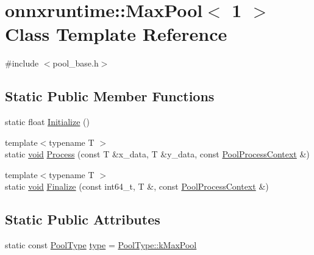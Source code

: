 \hypertarget{classonnxruntime_1_1MaxPool_3_011_01_4}{}\section{onnxruntime\+:\+:Max\+Pool$<$ 1 $>$ Class Template Reference}
\label{classonnxruntime_1_1MaxPool_3_011_01_4}


{\ttfamily \#include $<$pool\+\_\+base.\+h$>$}

\subsection*{Static Public Member Functions}
\begin{DoxyCompactItemize}
\item 
static float \mbox{\hyperlink{classonnxruntime_1_1MaxPool_3_011_01_4_a367e8d3ad38fd5a76cf422ef6915b104}{Initialize}} ()
\item 
{\footnotesize template$<$typename T $>$ }\\static \mbox{\hyperlink{mlasi_8h_a88f941d423cb2a819b70a1358982b1a6}{void}} \mbox{\hyperlink{classonnxruntime_1_1MaxPool_3_011_01_4_a02cd39e53eae93f41f8d10332e214b05}{Process}} (const T \&x\+\_\+data, T \&y\+\_\+data, const \mbox{\hyperlink{classonnxruntime_1_1PoolProcessContext}{Pool\+Process\+Context}} \&)
\item 
{\footnotesize template$<$typename T $>$ }\\static \mbox{\hyperlink{mlasi_8h_a88f941d423cb2a819b70a1358982b1a6}{void}} \mbox{\hyperlink{classonnxruntime_1_1MaxPool_3_011_01_4_ac23fd7b4bd131e2aa202b89b5d9565b2}{Finalize}} (const int64\+\_\+t, T \&, const \mbox{\hyperlink{classonnxruntime_1_1PoolProcessContext}{Pool\+Process\+Context}} \&)
\end{DoxyCompactItemize}
\subsection*{Static Public Attributes}
\begin{DoxyCompactItemize}
\item 
static const \mbox{\hyperlink{namespaceonnxruntime_aa4ff52f19ea8c4d3e4ce3ffbabbc7060}{Pool\+Type}} \mbox{\hyperlink{classonnxruntime_1_1MaxPool_3_011_01_4_a9fcb4025fec4b8807dc1237b820b4594}{type}} = \mbox{\hyperlink{namespaceonnxruntime_aa4ff52f19ea8c4d3e4ce3ffbabbc7060a5ff72b0901ac2c36434cfecb86f6d5ff}{Pool\+Type\+::k\+Max\+Pool}}
\end{DoxyCompactItemize}


